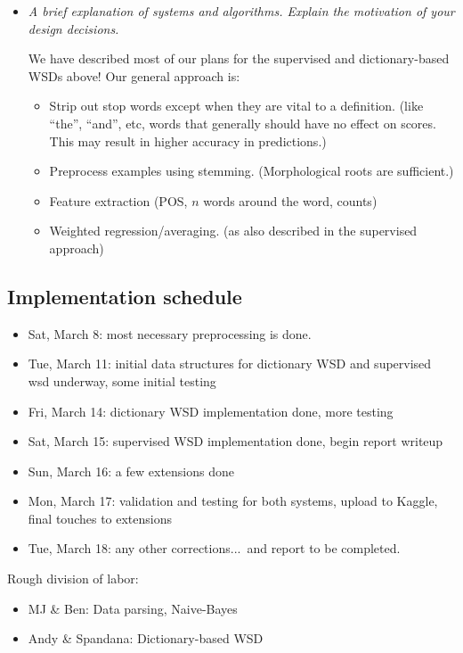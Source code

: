 \documentclass{article}
\begin{document}
\begin{itemize}
\item \textit{A brief explanation of systems and algorithms. Explain the motivation of your design decisions.}\par
We have described most of our plans for the supervised and dictionary-based WSDs above! Our general approach is:
\begin{itemize}[noitemsep,nolistsep]
\item Strip out stop words except when they are vital to a definition. (like ``the'', ``and'', etc, words that generally should have no effect on scores. This may result in higher accuracy in predictions.)
\item Preprocess examples using stemming. (Morphological roots are sufficient.)
\item Feature extraction (POS, $n$ words around the word, counts)
\item Weighted regression/averaging. (as also described in the supervised approach)
\end{itemize}

\end{itemize}

\subsection*{Implementation schedule}

\begin{itemize}[noitemsep]
\item Sat, March 8: most necessary preprocessing is done.
\item Tue, March 11: initial data structures for dictionary WSD and supervised wsd underway, some initial testing
\item Fri, March 14: dictionary WSD implementation done, more testing
\item Sat, March 15: supervised WSD implementation done, begin report writeup
\item Sun, March 16: a few extensions done
\item Mon, March 17: validation and testing for both systems, upload to Kaggle, final touches to extensions
\item Tue, March 18: any other corrections...\ and report to be completed.
\end{itemize}

Rough division of labor:
\begin{itemize}[noitemsep]
\item MJ \& Ben: Data parsing, Naive-Bayes
\item Andy \& Spandana: Dictionary-based WSD
\end{itemize}
\end{document}
